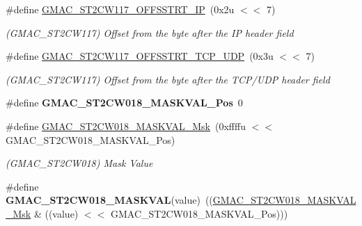 \begin{DoxyCompactItemize}
\mbox{\label{group__SAMV71__GMAC_ga27877fc6453f2b750a5c00a7b8730232}} 
\#define \mbox{\hyperlink{group__SAMV71__GMAC_ga27877fc6453f2b750a5c00a7b8730232}{G\+M\+A\+C\+\_\+\+S\+T2\+C\+W117\+\_\+\+O\+F\+F\+S\+S\+T\+R\+T\+\_\+\+IP}}~(0x2u $<$$<$ 7)
\begin{DoxyCompactList}\small\item\em (G\+M\+A\+C\+\_\+\+S\+T2\+C\+W117) Offset from the byte after the IP header field \end{DoxyCompactList}\item 
\mbox{\label{group__SAMV71__GMAC_ga64b6cb6108a10cbc1b13e59140bd5af7}} 
\#define \mbox{\hyperlink{group__SAMV71__GMAC_ga64b6cb6108a10cbc1b13e59140bd5af7}{G\+M\+A\+C\+\_\+\+S\+T2\+C\+W117\+\_\+\+O\+F\+F\+S\+S\+T\+R\+T\+\_\+\+T\+C\+P\+\_\+\+U\+DP}}~(0x3u $<$$<$ 7)
\begin{DoxyCompactList}\small\item\em (G\+M\+A\+C\+\_\+\+S\+T2\+C\+W117) Offset from the byte after the T\+C\+P/\+U\+DP header field \end{DoxyCompactList}\item 
\mbox{\label{group__SAMV71__GMAC_ga75c5826888017cd1d85bec4c8dc2b1bc}} 
\#define {\bfseries G\+M\+A\+C\+\_\+\+S\+T2\+C\+W018\+\_\+\+M\+A\+S\+K\+V\+A\+L\+\_\+\+Pos}~0
\item 
\mbox{\label{group__SAMV71__GMAC_gaf61e5a14c295aaf1404cb2015d3a06be}} 
\#define \mbox{\hyperlink{group__SAMV71__GMAC_gaf61e5a14c295aaf1404cb2015d3a06be}{G\+M\+A\+C\+\_\+\+S\+T2\+C\+W018\+\_\+\+M\+A\+S\+K\+V\+A\+L\+\_\+\+Msk}}~(0xffffu $<$$<$ G\+M\+A\+C\+\_\+\+S\+T2\+C\+W018\+\_\+\+M\+A\+S\+K\+V\+A\+L\+\_\+\+Pos)
\begin{DoxyCompactList}\small\item\em (G\+M\+A\+C\+\_\+\+S\+T2\+C\+W018) Mask Value \end{DoxyCompactList}\item 
\mbox{\label{group__SAMV71__GMAC_ga937784c236e237d13f77b7c38dedcc6c}} 
\#define {\bfseries G\+M\+A\+C\+\_\+\+S\+T2\+C\+W018\+\_\+\+M\+A\+S\+K\+V\+AL}(value)~((\mbox{\hyperlink{group__SAMV71__GMAC_gaf61e5a14c295aaf1404cb2015d3a06be}{G\+M\+A\+C\+\_\+\+S\+T2\+C\+W018\+\_\+\+M\+A\+S\+K\+V\+A\+L\+\_\+\+Msk}} \& ((value) $<$$<$ G\+M\+A\+C\+\_\+\+S\+T2\+C\+W018\+\_\+\+M\+A\+S\+K\+V\+A\+L\+\_\+\+Pos)))

\end{DoxyCompactItemize}

